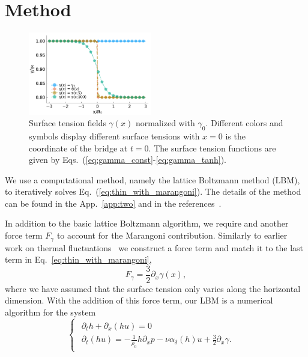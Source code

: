\documentclass[twocolumn,amsmath,amssymb,showpacs,nofootinbib,prfluids,superscriptaddress]{revtex4-2} %
\begin{document}
\section{Method}\label{sec:method}
\begin{figure}
    \centering
    \includegraphics[width=0.48\textwidth]{Figures/gammas.pdf}
    \caption{Surface tension fields $\gamma(x)$ normalized with $\gamma_0$.
    Different colors and symbols display different surface tensions with $x=0$ is the coordinate of the bridge at $t=0$.
    The surface tension functions are given by Eqs.~(\ref{eq:gamma_const}-\ref{eq:gamma_tanh}).
    }
    \label{fig:gammas}
\end{figure}
We use a computational method, namely the lattice Boltzmann method (LBM), to iteratively solves Eq.~(\ref{eq:thin_with_marangoni}).
The details of the method can be found in the App.~\ref{app:two} and in the references~\cite{PhysRevE.100.033313, PhysRevE.104.034801}.

In addition to the basic lattice Boltzmann algorithm, we require and another force term $F_{\gamma}$ to account for the Marangoni contribution.
Similarly to earlier work on thermal fluctuations~\cite{PhysRevE.104.034801} we construct a force term and match it to the last term in Eq.~\ref{eq:thin_with_marangoni}, 
\begin{equation}\label{eq:force_gamma_grad}
    F_{\gamma} = \frac{3}{2}\partial_x\gamma(x),
\end{equation}
where we have assumed that the surface tension only varies along the horizontal dimension.
With the addition of this force term, our LBM is a numerical algorithm for the system
\begin{equation}\label{eq:lubr2eq1surf}
\begin{cases}
\begin{array}{ll}
\partial_t h + \partial_x (h u)  = 0 & \\ 
\partial_t (h u) = -\frac{1}{\rho_0}h\partial_x p -\nu\alpha_{\delta}(h)u + \frac{3}{2}\partial_x\gamma.
\end{array}
\end{cases}
\end{equation}
\end{document}
